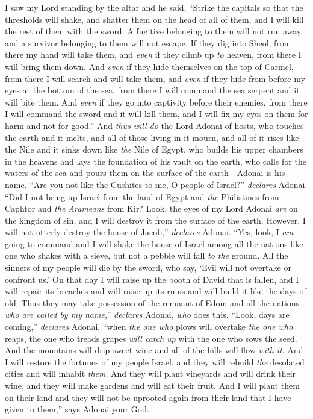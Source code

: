 \begin{biblechapter} %
 I saw my Lord standing by the altar and he said, “Strike the capitals so that the thresholds will shake, and shatter them on the head of all of them, and I will kill the rest of them with the sword. A fugitive belonging to them will not run away, and a survivor belonging to them will not escape.
\verse If they dig into Sheol, from there my hand will take them, and \textit{even} if they climb up \textit{to} heaven, from there I will bring them down.
\verse And \textit{even} if they hide themselves on the top of Carmel, from there I will search and will take them, and \textit{even} if they hide from before my eyes at the bottom of the sea, from there I will command the sea serpent and it will bite them.
\verse And \textit{even} if they go into captivity before their enemies, from there I will command the sword and it will kill them, and I will fix my eyes on them for harm and not for good.”
\verse And \textit{thus will do} the Lord Adonai of hosts, who touches the earth and it melts, and all of those living in it mourn, and all of it rises like the Nile and it sinks down like \textit{the} Nile of Egypt,
\verse who builds his upper chambers in the heavens and lays the foundation of his vault on the earth, who calls for the waters of the sea and pours them on the surface of the earth—Adonai is his name.
\verse “Are you not like the Cushites to me, O people of Israel?” \textit{declares} Adonai. “Did I not bring up Israel from the land of Egypt and \textit{the} Philistines from Caphtor and \textit{the Arameans} from Kir?
\verse Look, the eyes of my Lord Adonai \textit{are} on the kingdom of sin, and I will destroy it from the surface of the earth. However, I will not utterly destroy the house of Jacob,” \textit{declares} Adonai.
\verse “Yes, look, I \textit{am} going to command and I will shake the house of Israel among all the nations like one who shakes with a sieve, but not a pebble will fall \textit{to the} ground.
\verse All the sinners of my people will die by the sword, who say, ‘Evil will not overtake or confront us.’
 On that day I will raise up the booth of David that is fallen, and I will repair its breaches and will raise up its ruins and will build it like the days of old.
\verse Thus they may take possession of the remnant of Edom and all the nations \textit{who are called by my name},” \textit{declares} Adonai, \textit{who} does this.
\verse “Look, days are coming,” \textit{declares} Adonai, “when \textit{the one who} plows will overtake \textit{the one who} reaps, the one who treads grapes \textit{will catch up} with the one who sows the seed. And the mountains will drip sweet wine and all of the hills will flow \textit{with it}.
\verse And I will restore the fortunes of my people Israel, and they will rebuild \textit{the} desolated cities and will inhabit \textit{them}. And they will plant vineyards and will drink their wine, and they will make gardens and will eat their fruit.
\verse And I will plant them on their land and they will not be uprooted again from their land that I have given to them,” says Adonai your God.
\end{biblechapter}

